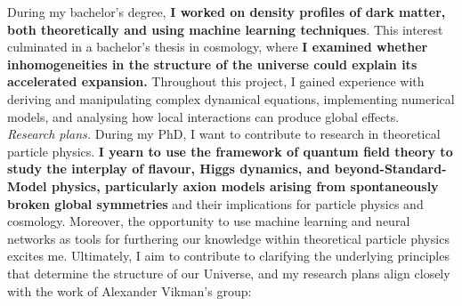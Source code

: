 \documentclass[a4paper, 11pt]{article}
\begin{document}
During my bachelor's degree, \textbf{I worked on density profiles of dark matter, both theoretically and using machine learning techniques}. This interest culminated in a bachelor’s thesis in cosmology, where \textbf{I examined whether inhomogeneities in the structure of the universe could explain its accelerated expansion.} Throughout this project, I gained experience with deriving and manipulating complex dynamical equations, implementing numerical models, and analysing how local interactions can produce global effects.\\

\textit{Research plans.} 
During my PhD, I want to contribute to research in theoretical particle physics. \textbf{I yearn to use the framework of quantum field theory to study the interplay of flavour, Higgs dynamics, and beyond-Standard-Model physics, particularly axion models arising from spontaneously broken global symmetries} and their implications for particle physics and cosmology. Moreover, the opportunity to use machine learning and neural networks as tools for furthering our knowledge within theoretical particle physics excites me. Ultimately, I aim to contribute to clarifying the underlying principles that determine the structure of our Universe, and my research plans align closely with the work of Alexander Vikman’s group:
\end{document}
